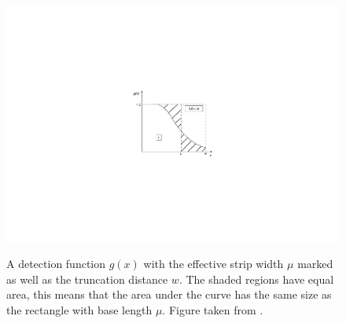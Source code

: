\begin{figure}
\centering
\includegraphics{intro/figs/muexplanation.pdf}\\
\caption{A detection function $g(x)$ with the effective strip width $\mu$ marked as well as the truncation distance $w$. The shaded regions have equal area, this means that the area under the curve has the same size as the rectangle with base length $\mu$. Figure taken from .\label{cor-7s6}}
\label{ds-mu-explanation}
\end{figure}


